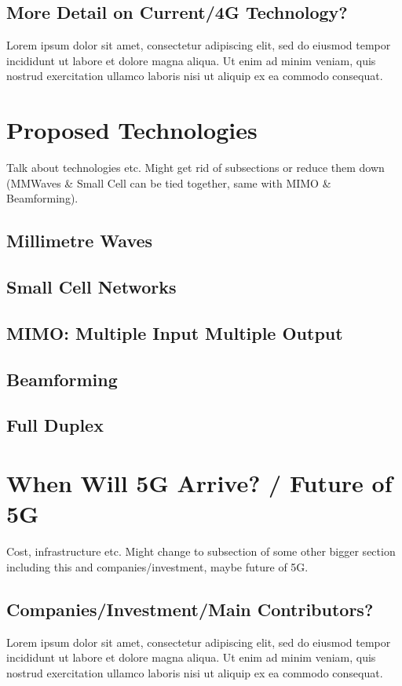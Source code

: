 \documentclass[journal]{IEEEtran}
\begin{document}
\subsection{More Detail on Current/4G Technology?}
Lorem ipsum dolor sit amet, consectetur adipiscing elit, sed do eiusmod tempor incididunt ut labore et dolore magna aliqua. Ut enim ad minim veniam, quis nostrud exercitation ullamco laboris nisi ut aliquip ex ea commodo consequat.

\section{Proposed Technologies}
Talk about technologies etc. Might get rid of subsections or reduce them down (MMWaves \& Small Cell can be tied together, same with MIMO \& Beamforming).
\subsection{Millimetre Waves}
\subsection{Small Cell Networks}
\subsection{MIMO: Multiple Input Multiple Output}
\subsection{Beamforming}
\subsection{Full Duplex}

\section{When Will 5G Arrive? / Future of 5G}
Cost, infrastructure etc. Might change to subsection of some other bigger section including this and companies/investment, maybe future of 5G.
\subsection{Companies/Investment/Main Contributors?}
Lorem ipsum dolor sit amet, consectetur adipiscing elit, sed do eiusmod tempor incididunt ut labore et dolore magna aliqua. Ut enim ad minim veniam, quis nostrud exercitation ullamco laboris nisi ut aliquip ex ea commodo consequat.
\end{document}
